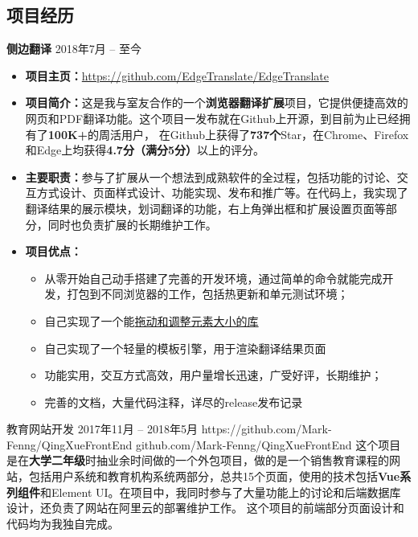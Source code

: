 \documentclass[10pt]{article} %
\begin{document}
\begin{paracol}{2}

\section{项目经历}


{\large{\textbf{侧边翻译}}} \hfill \textsc{2018年7月 -- 至今} %
	\begin{itemize}
		\item \textbf{项目主页：}\href{https://github.com/EdgeTranslate/EdgeTranslate}{\small{https://github.com/EdgeTranslate/EdgeTranslate}} %
		\item \textbf{项目简介：}{这是我与室友合作的一个\textbf{浏览器翻译扩展}项目，它提供便捷高效的网页和PDF翻译功能。这个项目一发布就在Github上开源，到目前为止已经拥有了\textbf{100K+}的周活用户，
		在Github上获得了\textbf{737个}Star，在Chrome、Firefox和Edge上均获得\textbf{4.7分（满分5分）}以上的评分。} %
		\item \textbf{主要职责：}{参与了扩展从一个想法到成熟软件的全过程，包括功能的讨论、交互方式设计、页面样式设计、功能实现、发布和推广等。在代码上，我实现了翻译结果的展示模块，划词翻译的功能，右上角弹出框和扩展设置页面等部分，同时也负责扩展的长期维护工作。} %
		\item \textbf{项目优点：}{
			\begin{itemize}			
			\item 从零开始自己动手搭建了完善的开发环境，通过简单的命令就能完成开发，打包到不同浏览器的工作，包括热更新和单元测试环境；
			\item 自己实现了一个能\href{https://github.com/EdgeTranslate/simple-moveable}{拖动和调整元素大小的库}
			\item 自己实现了一个轻量的模板引擎，用于渲染翻译结果页面			
			\item 功能实用，交互方式高效，用户量增长迅速，广受好评，长期维护；
			\item 完善的文档，大量代码注释，详尽的release发布记录
		\end{itemize}} %
	\end{itemize}


\projectentry
{教育网站开发}
{2017年11月 -- 2018年5月}
{https://github.com/Mark-Fenng/QingXueFrontEnd}
{github.com/Mark-Fenng/QingXueFrontEnd}
{这个项目是在\textbf{大学二年级}时抽业余时间做的一个外包项目，做的是一个销售教育课程的网站，包括用户系统和教育机构系统两部分，总共15个页面，使用的技术包括\textbf{Vue系列组件}和Element UI。在项目中，我同时参与了大量功能上的讨论和后端数据库设计，还负责了网站在阿里云的部署维护工作。} %
{这个项目的前端部分页面设计和代码均为我独自完成。} %


\end{paracol}

\end{document}
